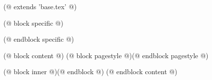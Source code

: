 (@ extends 'base.tex' @)

(@ block specific @)
    
(@ endblock specific @)

(@ block content @)
    (@ block pagestyle @)(@ endblock pagestyle @)
    \thispagestyle{seminar-first-(* competition.id *)-(* volume.id *)-(* semester.id *)}

    \afterpage{\aftergroup\restoregeometry}

    (@ block inner @)(@ endblock @)
(@ endblock content @)
